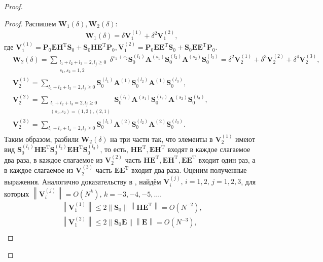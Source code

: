 \documentclass[specialist,
substylefile = spbu_report.rtx,
subf,href,colorlinks=true, 12pt]{disser}
\newcommand\norm[1]{\left\|#1\right\|}
\begin{document}
\begin{proof}
		\begin{proof}
			Распишем $\mathbf{W}_1(\delta), \mathbf{W}_2(\delta)$:
			\begin{align*}
				\mathbf{W}_1(\delta)=\delta \mathbf{V}_1^{(1)}+\delta^2\mathbf{V}_1^{(2)},
			\end{align*}
			где $\mathbf{V}_1^{(1)}=\mathbf{P}_0\mathbf{EH}^\mathrm{T}\mathbf{S}_0+\mathbf{S}_0\mathbf{HE}^\mathrm{T}\mathbf{P}_0, \mathbf{V}_1^{(2)}=\mathbf{P}_0\mathbf{EE}^\mathrm{T}\mathbf{S}_0+\mathbf{S}_0\mathbf{EE}^\mathrm{T}\mathbf{P}_0$.
			\begin{align*}
				&\mathbf{W}_2(\delta) = \sum_{\substack{l_1+l_2+l_3=2,l_j\geqslant0\\s_1,s_2=1,2}}\delta^{s_1+s_2}\mathbf{S}_0^{(l_1)}\mathbf{A}^{(s_1)}\mathbf{S}_0^{(l_2)}\mathbf{A}^{(s_2)}\mathbf{S}_0^{(l_3)}=\delta^2\mathbf{V}_2^{(1)}+\delta^3\mathbf{V}_2^{(2)}+\delta^4\mathbf{V}_2^{(3)},\\
				&\mathbf{V}_2^{(1)}=\sum_{l_1+l_2+l_3=2,l_j\geqslant0}\mathbf{S}_0^{(l_1)}\mathbf{A}^{(1)}\mathbf{S}_0^{(l_2)}\mathbf{A}^{(1)}\mathbf{S}_0^{(l_3)},\\
				&\mathbf{V}_2^{(2)}=\sum_{\substack{l_1+l_2+l_3=2,l_j\geqslant0\\(s_1,s_2)=(1,2),(2,1)}}\mathbf{S}_0^{(l_1)}\mathbf{A}^{(s_1)}\mathbf{S}_0^{(l_2)}\mathbf{A}^{(s_2)}\mathbf{S}_0^{(l_3)},\\
				&\mathbf{V}_2^{(3)}=\sum_{l_1+l_2+l_3=2,l_j\geqslant0}\mathbf{S}_0^{(l_1)}\mathbf{A}^{(2)}\mathbf{S}_0^{(l_2)}\mathbf{A}^{(2)}\mathbf{S}_0^{(l_3)}.
			\end{align*}
			Таким образом, разбили $\mathbf{W}_2(\delta)$ на три части так, что элементы в $\mathbf{V}_2^{(1)}$ имеют вид $\mathbf{S}_0^{(l_1)}\mathbf{HE}^\mathrm{T}\mathbf{S}_0^{(l_2)}\mathbf{EH}^\mathrm{T}\mathbf{S}_0^{(l_3)}$, то есть, $\mathbf{HE}^\mathrm{T},\mathbf{EH}^\mathrm{T}$ входят в каждое слагаемое два раза, в каждое слагаемое из $\mathbf{V}_2^{(2)}$ часть $\mathbf{HE}^\mathrm{T},\mathbf{EH}^\mathrm{T},\mathbf{EE}^\mathrm{T}$ входит один раз, а в каждое слагаемое из $\mathbf{V}_2^{(3)}$ часть $\mathbf{EE}^\mathrm{T}$ входит два раза. Оценим полученные выражения. Аналогично доказательству в \cite{ZNekrutkin}, найдём $\mathbf{V}_i^{(j)},\, i=1,2,\, j=1,2,3$, для которых $\norm{\mathbf{V}_i^{(j)}}=O(N^{k}),\, k=-3,-4,-5,\dots$. 
			\begin{align*}
				\norm{\mathbf{V}_1^{(1)}}\leqslant 2\norm{\mathbf{S}_0}\norm{\mathbf{HE}^\mathrm{T}}=O(N^{-2}),\\
				\norm{\mathbf{V}_1^{(2)}}\leqslant 2\norm{\mathbf{S}_0\mathbf{E}}\norm{\mathbf{E}}=O(N^{-3}),\\

\end{align*}
\end{proof}
\end{proof}
\end{document}
